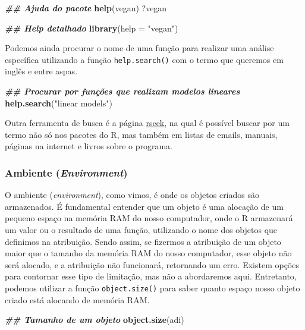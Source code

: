 \documentclass[
]{article}
\newenvironment{Shaded}{\begin{snugshade}}{\end{snugshade}}
\newcommand{\AttributeTok}[1]{\textcolor[rgb]{0.13,0.29,0.53}{#1}}
\newcommand{\DocumentationTok}[1]{\textcolor[rgb]{0.56,0.35,0.01}{\textbf{\textit{#1}}}}
\newcommand{\FunctionTok}[1]{\textcolor[rgb]{0.13,0.29,0.53}{\textbf{#1}}}
\newcommand{\NormalTok}[1]{#1}
\newcommand{\StringTok}[1]{\textcolor[rgb]{0.31,0.60,0.02}{#1}}
\begin{document}
\begin{Shaded}
\begin{Highlighting}[]
\DocumentationTok{\#\# Ajuda do pacote}
\FunctionTok{help}\NormalTok{(vegan)}
\NormalTok{?vegan}

\DocumentationTok{\#\# Help detalhado}
\FunctionTok{library}\NormalTok{(}\AttributeTok{help =} \StringTok{"vegan"}\NormalTok{)}
\end{Highlighting}
\end{Shaded}

Podemos ainda procurar o nome de uma função para realizar uma análise específica utilizando a função \texttt{help.search()} com o termo que queremos em inglês e entre aspas.

\begin{Shaded}
\begin{Highlighting}[]
\DocumentationTok{\#\# Procurar por funções que realizam modelos lineares}
\FunctionTok{help.search}\NormalTok{(}\StringTok{"linear models"}\NormalTok{)}
\end{Highlighting}
\end{Shaded}

Outra ferramenta de busca é a página \href{http://www.rseek.org}{rseek}, na qual é possível buscar por um termo não só nos pacotes do R, mas também em listas de emails, manuais, páginas na internet e livros sobre o programa.

\hypertarget{ambiente-environment}{%
\subsubsection{\texorpdfstring{Ambiente (\emph{Environment})}{Ambiente (Environment)}}\label{ambiente-environment}}

O ambiente (\emph{environment}), como vimos, é onde os objetos criados são armazenados. É fundamental entender que um objeto é uma alocação de um pequeno espaço na memória RAM do nosso computador, onde o R armazenará um valor ou o resultado de uma função, utilizando o nome dos objetos que definimos na atribuição. Sendo assim, se fizermos a atribuição de um objeto maior que o tamanho da memória RAM do nosso computador, esse objeto não será alocado, e a atribuição não funcionará, retornando um erro. Existem opções para contornar esse tipo de limitação, mas não a abordaremos aqui. Entretanto, podemos utilizar a função \texttt{object.size()} para saber quanto espaço nosso objeto criado está alocando de memória RAM.

\begin{Shaded}
\begin{Highlighting}[]
\DocumentationTok{\#\# Tamanho de um objeto}
\FunctionTok{object.size}\NormalTok{(adi)}
\end{Highlighting}
\end{Shaded}
\end{document}
